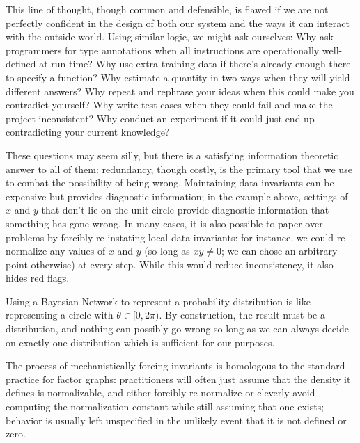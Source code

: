 \documentclass{article}
\numberwithin{equation}{section}
\begin{document}
\begin{notfocus}
\begin{vfull}
		This line of thought, though common and defensible, is flawed if we are not perfectly confident in the design of both our system and the ways it can interact with the outside world. Using similar logic, we might ask ourselves: Why ask programmers for type annotations when all instructions are operationally well-defined at run-time?  Why use extra training data if there's already enough there to specify a function? Why estimate a quantity in two ways when they will yield different answers? Why repeat and rephrase your ideas when this could make you contradict yourself? Why write test cases when they could fail and make the project inconsistent? Why conduct an experiment if it could just end up contradicting your current knowledge?
		
		These questions may seem silly, but there is a satisfying information theoretic answer to all of them: redundancy, though costly, is the primary tool that we use to combat the possibility of being wrong. Maintaining data invariants can be expensive but provides diagnostic information; in the example above, settings of $x$ and $y$ that don't lie on the unit circle provide diagnostic information that something has gone wrong.
		In many cases, it is also possible to paper over problems by forcibly re-instating local data invariants: for instance, we could re-normalize any values of $x$ and $y$ (so long as $xy \neq 0$; we can chose an arbitrary point otherwise) at every step. While this would reduce inconsistency, it also hides red flags.
		
		Using a Bayesian Network to represent a probability distribution is like representing a circle with $\theta \in [0, 2\pi)$.
		By construction, the result must be a distribution, and nothing can possibly go wrong so long as we can always decide on exactly one distribution which is sufficient for our purposes.
		
		
		The process of mechanistically forcing invariants is homologous to the standard practice for factor graphs: practitioners will often just assume that the density it defines is normalizable, and either forcibly re-normalize or cleverly avoid computing the normalization constant while still assuming that one exists; behavior is usually left unspecified in the unlikely event that it is not defined or zero.
	\end{vfull}
	

\end{notfocus}
\end{document}
